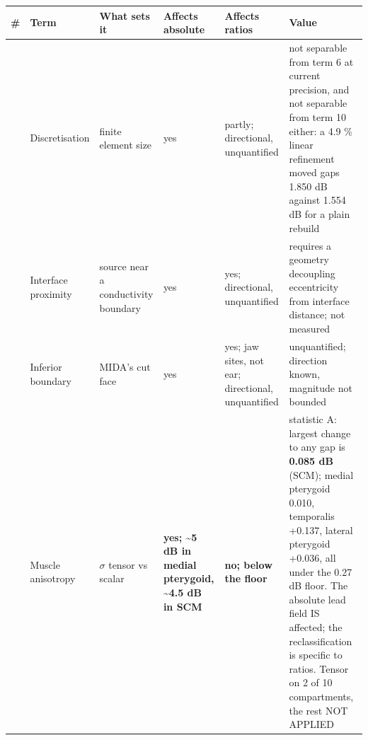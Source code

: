 \documentclass[manuscript,review,anonymous]{acmart}
\newcounter{none}
\begin{document}
{\def\LTcaptype{none} %
\begin{longtable}[]{@{}
  >{\raggedright\arraybackslash}p{}
  >{\raggedright\arraybackslash}p{}
  >{\raggedright\arraybackslash}p{}
  >{\raggedright\arraybackslash}p{}
  >{\raggedright\arraybackslash}p{}
  >{\raggedright\arraybackslash}p{}@{}}
\toprule\noalign{}
\begin{minipage}[b]{\linewidth}\raggedright
\#
\end{minipage} & \begin{minipage}[b]{\linewidth}\raggedright
Term
\end{minipage} & \begin{minipage}[b]{\linewidth}\raggedright
What sets it
\end{minipage} & \begin{minipage}[b]{\linewidth}\raggedright
Affects absolute
\end{minipage} & \begin{minipage}[b]{\linewidth}\raggedright
Affects ratios
\end{minipage} & \begin{minipage}[b]{\linewidth}\raggedright
Value
\end{minipage} \\
\midrule\noalign{}
\endhead
\bottomrule\noalign{}
\endlastfoot
1 & Discretisation & finite element size & yes & partly; directional, unquantified & not separable from term 6 at current precision, and not separable from term 10 either: a 4.9 \% linear refinement moved gaps 1.850 dB against 1.554 dB for a plain rebuild \\
2 & Interface proximity & source near a conductivity boundary & yes & yes; directional, unquantified & requires a geometry decoupling eccentricity from interface distance; not measured \\
3 & Inferior boundary & MIDA's cut face & yes & yes; jaw sites, not ear; directional, unquantified & unquantified; direction known, magnitude not bounded \\
4 & Muscle anisotropy & $\sigma$ tensor vs scalar & \textbf{yes; \textasciitilde5 dB in medial pterygoid, \textasciitilde4.5 dB in SCM} & \textbf{no; below the floor} & statistic A: largest change to any gap is \textbf{\textminus{}0.085 dB} (SCM); medial pterygoid \textminus{}0.010, temporalis +0.137, lateral pterygoid +0.036, all under the 0.27 dB floor. The absolute lead field IS affected; the reclassification is specific to ratios. Tensor on 2 of 10 compartments, the rest NOT APPLIED \\

\end{longtable}}
\end{document}

